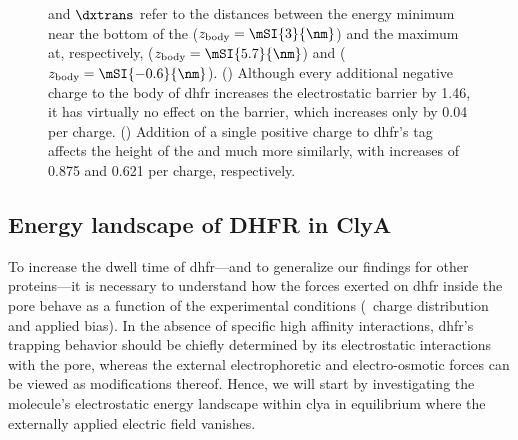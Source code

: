 \begin{figure*}[p]
{    and $\dxtrans$ refer to the distances between the energy minimum near the bottom of the \lumen{}
    ($z_{\rm{body}} = \mSI{3}{\nm}$) and the maximum at, respectively, \cisi{} ($z_{\rm{body}} =
    \mSI{5.7}{\nm}$) and \transi{} ($z_{\rm{body}} = \mSI{-0.6}{\nm}$).
    ()
    Although every additional negative charge to the body of \gls{dhfr} increases the \transi{} electrostatic
    barrier by \SI{1.46}{\kT}, it has virtually no effect on the \cisi{} barrier, which increases only by
    \SI{0.04}{\kT} per charge.
    ()
    Addition of a single positive charge to \gls{dhfr}'s tag affects the height of the \transi{} and \cisi{}
    much more similarly, with increases of \SI{0.875}{\kT} and \SI{0.621}{\kT} per charge, respectively.
  }\label{fig:apbs_simulation_results}
\end{figure*}
%


\subsection{Energy landscape of {DHFR} in {ClyA}}
%

To increase the dwell time of \gls{dhfr}---and to generalize our findings for other proteins---it is necessary
to understand how the forces exerted on \gls{dhfr} inside the pore behave as a function of the experimental
conditions (\ie~charge distribution and applied bias). In the absence of specific high affinity interactions,
\gls{dhfr}'s trapping behavior should be chiefly determined by its electrostatic interactions with the pore,
whereas the external electrophoretic and electro-osmotic forces can be viewed as modifications thereof. Hence,
we will start by investigating the molecule's electrostatic energy landscape within \gls{clya} in equilibrium
where the externally applied electric field vanishes.

